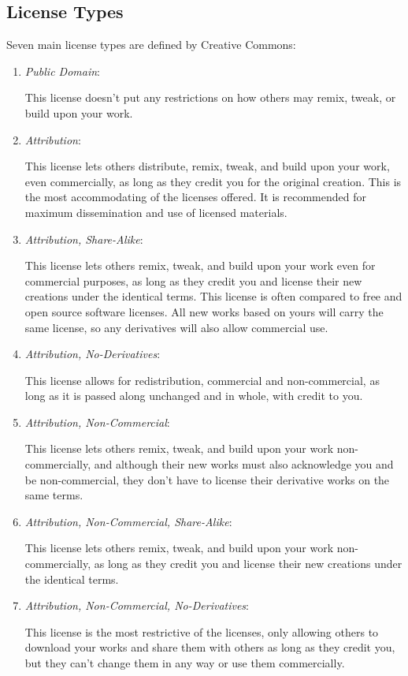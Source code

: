 \documentclass[botnum,fleqn,final]{unmeethesis}
\begin{document}
\subsection{License Types}\label{section:intro:cc:license types}

Seven main license types are defined by Creative Commons:

\begin{enumerate}
  \item \emph{Public Domain}:

  This license doesn't put any restrictions on how others may remix, tweak, or
  build upon your work.

  \item \emph{Attribution}:

  This license lets others distribute, remix, tweak, and build upon your work,
  even commercially, as long as they credit you for the original creation. This
  is the most accommodating of the licenses offered.  It is recommended for
  maximum dissemination and use of licensed materials.

  \item \emph{Attribution, Share-Alike}:

  This license lets others remix, tweak, and build upon your work even for
  commercial purposes, as long as they credit you and license their new
  creations under the identical terms.  This license is often compared to free
  and open source software licenses.  All new works based on yours will carry
  the same license, so any derivatives will also allow commercial use.

  \item \emph{Attribution, No-Derivatives}:

  This license allows for redistribution, commercial and non-commercial, as
  long as it is passed along unchanged and in whole, with credit to you.

  \item \emph{Attribution, Non-Commercial}:

  This license lets others remix, tweak, and build upon your work
  non-commercially, and although their new works must also acknowledge you and be
  non-commercial, they don't have to license their derivative works on the same
  terms.

  \item \emph{Attribution, Non-Commercial, Share-Alike}:

  This license lets others remix, tweak, and build upon your work
  non-commercially, as long as they credit you and license their new creations
  under the identical terms.

  \item \emph{Attribution, Non-Commercial, No-Derivatives}:

  This license is the most restrictive of the licenses, only allowing others to
  download your works and share them with others as long as they credit you, but
  they can't change them in any way or use them commercially.
\end{enumerate}
\end{document}
